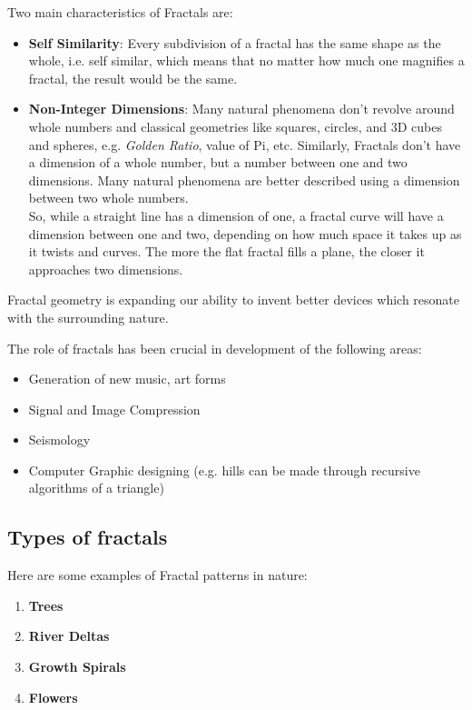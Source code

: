 \documentclass{resonance}
\begin{document}
Two main characteristics of Fractals are:
\begin{itemize}
    \item \textbf{Self Similarity}: Every subdivision of a fractal has the same shape as the whole, i.e. self similar, which means that no matter how much one magnifies a fractal, the result would be the same.
    \item \textbf{Non-Integer Dimensions}: Many natural phenomena don’t revolve around whole numbers and classical geometries like squares, circles, and 3D cubes and spheres, e.g. \textit{Golden Ratio}, value of Pi, etc. Similarly, Fractals don’t have a dimension of a whole number, but a number between one and two dimensions. Many natural phenomena are better described using a dimension between two whole numbers.\\

    So, while a straight line has a dimension of one, a fractal curve will have a dimension between one and two, depending on how much space it takes up as it twists and curves. The more the flat fractal fills a plane, the closer it approaches two dimensions.
\end{itemize}

Fractal geometry is expanding our ability to invent better devices which resonate with the surrounding nature.

The role of fractals has been crucial in development of the following areas:
\begin{itemize}
    \item Generation of new music, art forms
    \item Signal and Image Compression
    \item Seismology
    \item Computer Graphic designing (e.g. hills can be made through recursive algorithms of a triangle)
\end{itemize}

\subsection*{Types of fractals}

Here are some examples of Fractal patterns in nature:
\begin{enumerate}
    \item \textbf{Trees}
    \item \textbf{River Deltas}
    \item \textbf{Growth Spirals}
    \item \textbf{Flowers}
\end{enumerate}
\end{document}
